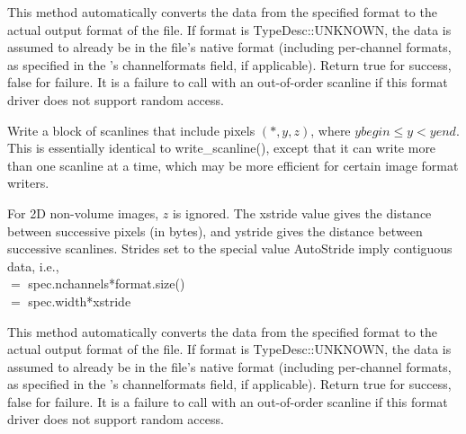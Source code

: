 This method automatically converts the data from the specified {\kw format}
to the actual output format of the file.  
If {\cf format} is {\cf TypeDesc::UNKNOWN}, the data is assumed to
already be in the file's native format (including per-channel formats, 
as specified in the \ImageSpec's {\cf channelformats} field, if applicable).
Return {\kw true} for success, {\kw false} for failure.  
It is a failure to call \writescanline with an
out-of-order scanline if this format driver does not support random
access.
\apiend


Write a block of scanlines that include pixels $(*,y,z)$,
where ${\mathit ybegin} \le y < {\mathit yend}$.  This is essentially
identical to {\cf write_scanline()}, except that it can write more than
one scanline at a time, which may be more efficient for certain
image format writers.

For 2D non-volume images, $z$ is ignored.  The {\kw xstride} value gives
the distance between successive pixels (in bytes), and {\kw ystride}
gives the distance between successive scanlines.  Strides set to the
special value {\kw AutoStride} imply contiguous data, i.e., \\
  $=$ {\kw spec.nchannels*format.size()} \\  $=$ {\kw spec.width*xstride}

This method automatically converts the data from the specified {\kw format}
to the actual output format of the file.  
If {\cf format} is {\cf TypeDesc::UNKNOWN}, the data is assumed to
already be in the file's native format (including per-channel formats, 
as specified in the \ImageSpec's {\cf channelformats} field, if applicable).
Return {\kw true} for success, {\kw false} for failure.  
It is a failure to call \writescanline with an
out-of-order scanline if this format driver does not support random
access.
\apiend


